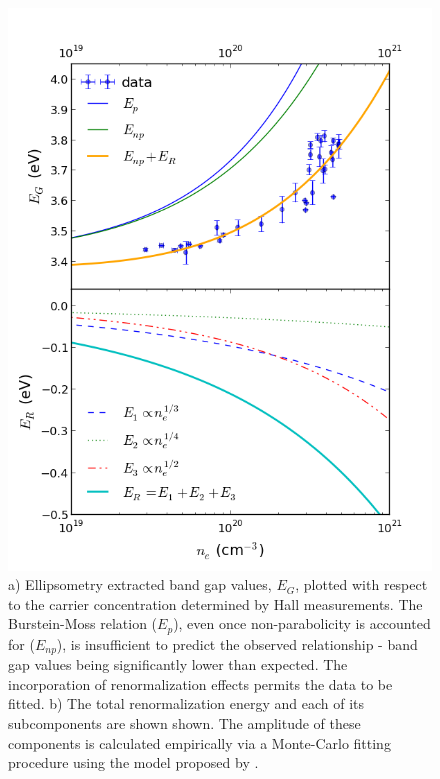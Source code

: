 \documentclass[final,5p,times]{elsarticle}
\begin{document}
\begin{figure}[t!]
\vspace{-1cm}
\centering
\includegraphics[width = 1.0\columnwidth]{figure5_b.png}
\caption{\label{fig:4} a) Ellipsometry extracted band gap values, $E_G$, plotted with respect to the carrier concentration determined by Hall measurements. The Burstein-Moss relation ($E_p$), even once non-parabolicity is accounted for ($E_{np}$), is insufficient to predict the observed relationship - band gap values being significantly lower than expected. The incorporation of renormalization effects permits the data to be fitted. b) The total renormalization energy and each of its subcomponents are shown shown. The amplitude of these components is calculated empirically via a Monte-Carlo fitting procedure using the model proposed by \cite{Jain1990}. }
\end{figure}
\end{document}
